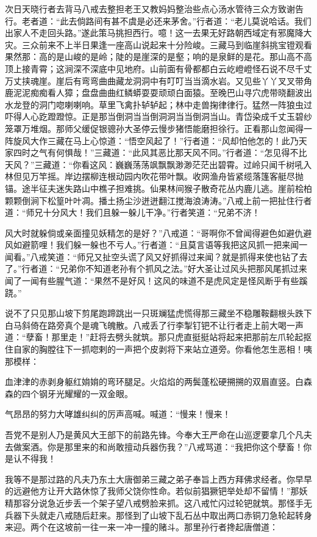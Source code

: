 \documentclass[12pt,UTF8]{ctexbook}
\begin{document}
次日天晓行者去背马八戒去整担老王又教妈妈整治些点心汤水管待三众方致谢告行。老者道：“此去倘路间有甚不虞是必还来茅舍。”行者道：“老儿莫说哈话。我们出家人不走回头路。”遂此策马挑担西行。噫！这一去果无好路朝西域定有邪魔降大灾。三众前来不上半日果逢一座高山说起来十分险峻。三藏马到临崖斜挑宝镫观看果然那：高的是山峻的是岭；陡的是崖深的是壑；响的是泉鲜的是花。那山高不高顶上接青霄；这涧深不深底中见地府。山前面有骨都都白云屹嶝嶝怪石说不尽千丈万丈挟魂崖。崖后有弯弯曲曲藏龙洞洞中有叮叮当当滴水岩。又见些丫丫叉叉带角鹿泥泥痴痴看人獐；盘盘曲曲红鳞蟒耍耍顽顽白面猿。至晚巴山寻穴虎带晓翻波出水龙登的洞门唿喇喇响。草里飞禽扑轳轳起；林中走兽掬律律行。猛然一阵狼虫过吓得人心趷蹬蹬惊。正是那当倒洞当当倒洞洞当当倒洞当山。青岱染成千丈玉碧纱笼罩万堆烟。那师父缓促银骢孙大圣停云慢步猪悟能磨担徐行。正看那山忽闻得一阵旋风大作三藏在马上心惊道：“悟空风起了！”行者道：“风却怕他怎的！此乃天家四时之气有何惧哉！”三藏道：“此风其恶比那天风不同。”行者道：“怎见得不比天风？”三藏道：“你看这风：巍巍荡荡飒飘飘渺渺茫茫出碧霄。过岭只闻千树吼入林但见万竿摇。岸边摆柳连根动园内吹花带叶飘。收网渔舟皆紧缆落篷客艇尽抛锚。途半征夫迷失路山中樵子担难挑。仙果林间猴子散奇花丛内鹿儿逃。崖前桧柏颗颗倒涧下松篁叶叶凋。播土扬尘沙迸迸翻江搅海浪涛涛。”八戒上前一把扯住行者道：“师兄十分风大！我们且躲一躲儿干净。”行者笑道：“兄弟不济！

风大时就躲倘或亲面撞见妖精怎的是好？”八戒道：“哥啊你不曾闻得避色如避仇避风如避箭哩！我们躲一躲也不亏人。”行者道：“且莫言语等我把这风抓一把来闻一闻看。”八戒笑道：“师兄又扯空头谎了风又好抓得过来闻？就是抓得来使也钻了去了。”行者道：“兄弟你不知道老孙有个抓风之法。”好大圣让过风头把那风尾抓过来闻了一闻有些腥气道：“果然不是好风！这风的味道不是虎风定是怪风断乎有些蹊跷。”

说不了只见那山坡下剪尾跑蹄跳出一只斑斓猛虎慌得那三藏坐不稳雕鞍翻根头跌下白马斜倚在路旁真个是魂飞魄散。八戒丢了行李掣钉钯不让行者走上前大喝一声道：“孽畜！那里走！”赶将去劈头就筑。那只虎直挺挺站将起来把那前左爪轮起抠住自家的胸膛往下一抓唿剌的一声把个皮剥将下来站立道旁。你看他怎生恶相！咦那模样：

血津津的赤剥身躯红姢姢的弯环腿足。火焰焰的两鬓蓬松硬搠搠的双眉直竖。白森森的四个钢牙光耀耀的一双金眼。

气昂昂的努力大哮雄纠纠的厉声高喊。喊道：“慢来！慢来！

吾党不是别人乃是黄风大王部下的前路先锋。今奉大王严命在山巡逻要拿几个凡夫去做案酒。你是那里来的和尚敢擅动兵器伤我？”八戒骂道：“我把你这个孽畜！你是认不得我！

我等不是那过路的凡夫乃东土大唐御弟三藏之弟子奉旨上西方拜佛求经者。你早早的远避他方让开大路休惊了我师父饶你性命。若似前猖獗钯举处却不留情！”那妖精那容分说急近步丢一个架子望八戒劈脸来抓。这八戒忙闪过轮钯就筑。那怪手无兵器下头就走八戒随后赶来。那怪到了山坡下乱石丛中取出两口赤铜刀急轮起转身来迎。两个在这坡前一往一来一冲一撞的赌斗。那里孙行者搀起唐僧道：
\end{document}

